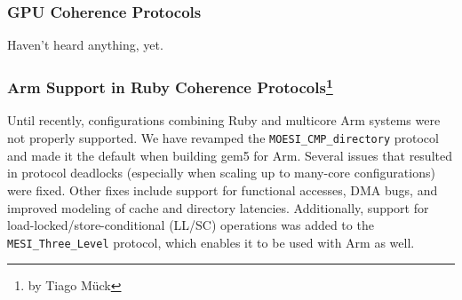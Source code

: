 \subsubsection[GPU Coherence Protocols]{GPU Coherence Protocols}

Haven't heard anything, yet.

\subsubsection[Arm Support and Extensions]{Arm Support in Ruby Coherence Protocols\footnote{by Tiago M{\"u}ck}}

Until recently, configurations combining Ruby and multicore Arm systems were not properly supported.
We have revamped the \verb|MOESI_CMP_directory| protocol and made it the default when building gem5 for Arm.
Several issues that resulted in protocol deadlocks (especially when scaling up to many-core configurations) were fixed.
Other fixes include support for functional accesses, DMA bugs, and improved modeling of cache and directory latencies.
Additionally, support for load-locked/store-conditional (LL/SC) operations was added to the \verb|MESI_Three_Level| protocol, which enables it to be used with Arm as well.
